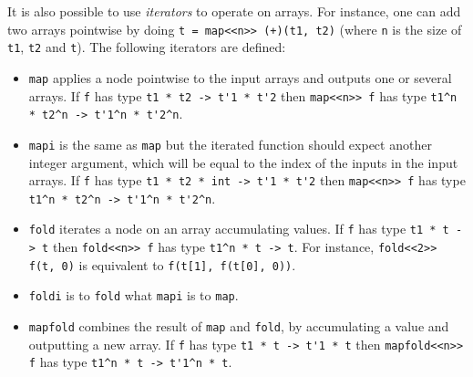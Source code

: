 \documentclass[a4paper]{article}
\begin{document}
It is also possible to use \emph{iterators} to operate on arrays. For instance, one can add two arrays pointwise by doing \lstinline{t = map<<n>> (+)(t1, t2)} (where \lstinline+n+ is the size of \lstinline+t1+, \lstinline+t2+ and \lstinline+t+).  The following iterators are defined:
\begin{itemize}
\item \lstinline+map+ applies a node pointwise to the input arrays and outputs one or several arrays. If \lstinline+f+ has type \lstinline+t1 * t2 -> t'1 * t'2+ then \lstinline+map<<n>> f+ has type \lstinline+t1^n * t2^n -> t'1^n * t'2^n+.
\item \lstinline+mapi+ is the same as \lstinline+map+ but the iterated function should expect another integer argument, which will be equal to the index of the inputs in the input arrays. If \lstinline+f+ has type \lstinline+t1 * t2 * int -> t'1 * t'2+ then \lstinline+map<<n>> f+ has type \lstinline+t1^n * t2^n -> t'1^n * t'2^n+. 
\item \lstinline+fold+ iterates a node on an array accumulating values. If \lstinline+f+ has type \lstinline+t1 * t -> t+ then \lstinline+fold<<n>> f+ has type \lstinline+t1^n * t -> t+. For instance,  \lstinline+fold<<2>> f(t, 0)+ is equivalent to  \lstinline+f(t[1], f(t[0], 0))+.
\item \lstinline+foldi+ is to  \lstinline+fold+ what  \lstinline+mapi+ is to  \lstinline+map+.
\item  \lstinline+mapfold+ combines the result of  \lstinline+map+ and  \lstinline+fold+, by accumulating a value and outputting a new array. If \lstinline+f+ has type \lstinline+t1 * t -> t'1 * t+ then \lstinline+mapfold<<n>> f+ has type \lstinline+t1^n * t -> t'1^n * t+.
\end{itemize}
\end{document}

